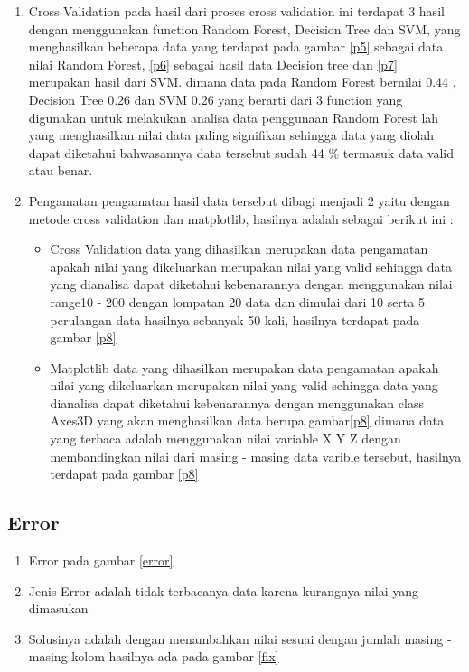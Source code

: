 \begin{enumerate}
\item Cross Validation
\subitem
pada hasil dari proses cross validation ini terdapat 3 hasil dengan menggunakan function Random Forest, Decision Tree dan SVM, yang menghasilkan beberapa data yang terdapat pada gambar \ref{p5} sebagai data nilai Random Forest, \ref{p6} sebagai hasil data Decision tree dan \ref{p7} merupakan hasil dari SVM. dimana data pada Random Forest bernilai 0.44 , Decision Tree 0.26 dan SVM 0.26 yang berarti dari 3 function yang digunakan untuk melakukan analisa data penggunaan Random Forest lah yang menghasilkan nilai data paling signifikan sehingga data yang diolah dapat diketahui bahwasannya data tersebut sudah 44 \% termasuk data valid atau benar.

\item Pengamatan
pengamatan hasil data tersebut dibagi menjadi 2 yaitu dengan metode cross validation dan matplotlib, hasilnya adalah sebagai berikut ini :
\begin{itemize}
\item Cross Validation
\subitem
data yang dihasilkan merupakan data pengamatan apakah nilai yang dikeluarkan merupakan nilai yang valid sehingga data yang dianalisa dapat diketahui kebenarannya dengan menggunakan nilai range10 - 200 dengan lompatan 20 data dan dimulai dari 10 serta 5 perulangan data hasilnya sebanyak 50 kali, hasilnya terdapat pada gambar \ref{p8}
\item Matplotlib
\subitem
data yang dihasilkan merupakan data pengamatan apakah nilai yang dikeluarkan merupakan nilai yang valid sehingga data yang dianalisa dapat diketahui kebenarannya dengan menggunakan class Axes3D yang akan menghasilkan data berupa gambar\ref{p8} dimana data yang terbaca adalah menggunakan nilai variable X Y Z dengan membandingkan nilai dari masing - masing data varible tersebut, hasilnya terdapat pada gambar \ref{p8}
\end{itemize}
\end{enumerate}

\subsection{Error}
\begin{enumerate}
\item Error pada gambar \ref{error}
\item Jenis Error adalah tidak terbacanya data karena kurangnya nilai yang dimasukan
\item Solusinya adalah dengan menambahkan nilai sesuai dengan jumlah masing - masing kolom hasilnya ada pada gambar \ref{fix}
\end{enumerate}


